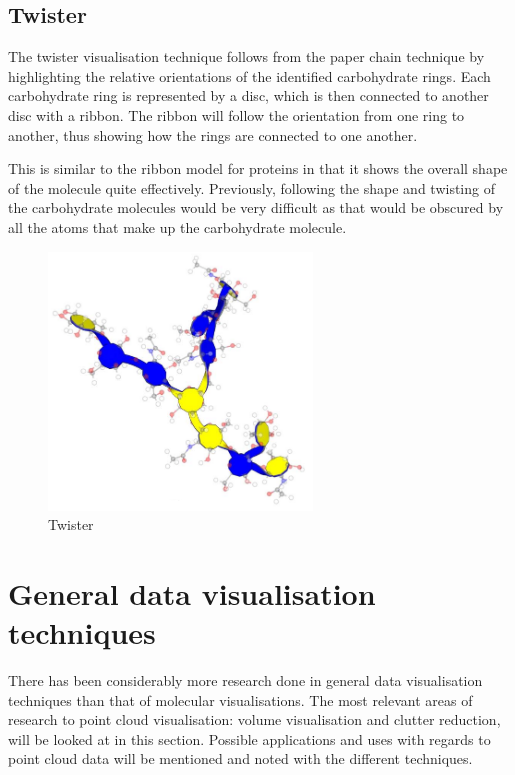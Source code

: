 \documentclass[a4paper]{article}
\begin{document}
\subsection*{Twister}
The twister visualisation technique \citep{kuttel06} follows from the paper
chain technique by highlighting the relative orientations of the identified
carbohydrate rings. Each carbohydrate ring is represented by a disc, which is
then connected to another disc with a ribbon. The ribbon will follow the
orientation from one ring to another, thus showing how the rings are connected
to one another.

This is similar to the ribbon model for proteins in that it shows the overall
shape of the molecule quite effectively. Previously, following the shape and
twisting of the carbohydrate molecules would be very difficult as that would be
obscured by all the atoms that make up the carbohydrate molecule.

\begin{figure}[h!]
  \begin{center}
    \includegraphics[width=70mm]{twister}
  \end{center}
  \caption{Twister}
  \label{fig:twister}
\end{figure}


\section{General data visualisation techniques}

There has been considerably more research done in general data visualisation
techniques than that of molecular visualisations. The most relevant areas of
research to point cloud visualisation: volume visualisation and clutter
reduction, will be looked at in this section. Possible applications and uses
with regards to point cloud data will be mentioned and noted with the different
techniques.
\end{document}
